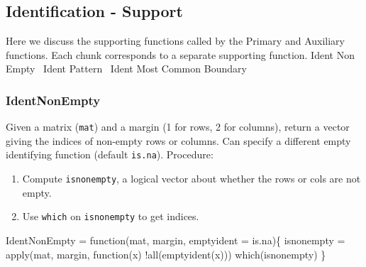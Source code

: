 \documentclass[a4paper]{article}
\begin{document}
\subsection{Identification - Support}
\label{sec:IdentSupport}
Here we discuss the supporting functions called by the Primary and
Auxiliary functions. Each chunk corresponds to a separate supporting
function.
\nwenddocs{}\endmoddef
\LA{}Ident Non Empty~{\nwtagstyle{}}\RA{}
\LA{}Ident Pattern~{\nwtagstyle{}}\RA{}
\LA{}Ident Most Common Boundary~{\nwtagstyle{}}\RA{}
\nwendcode{}\nwdocspar

\subsubsection{IdentNonEmpty}
Given a matrix (\verb|mat|) and a margin (1 for rows, 2 for
columns), return a vector giving the indices of non-empty rows or
columns. Can specify a different empty identifying function (default
\verb|is.na|). Procedure:
\begin{enumerate}
\item Compute \verb|isnonempty|, a logical vector about whether the
  rows or cols are not empty.
\item Use \verb|which| on \verb|isnonempty| to get indices.
\end{enumerate}
\nwenddocs{}\endmoddef
IdentNonEmpty =
  function(mat, margin, emptyident = is.na)\{
    isnonempty = apply(mat, margin, function(x) !all(emptyident(x)))
    which(isnonempty)
  \}
\eatline
{}\nwendcode{}\nwdocspar
\end{document}
